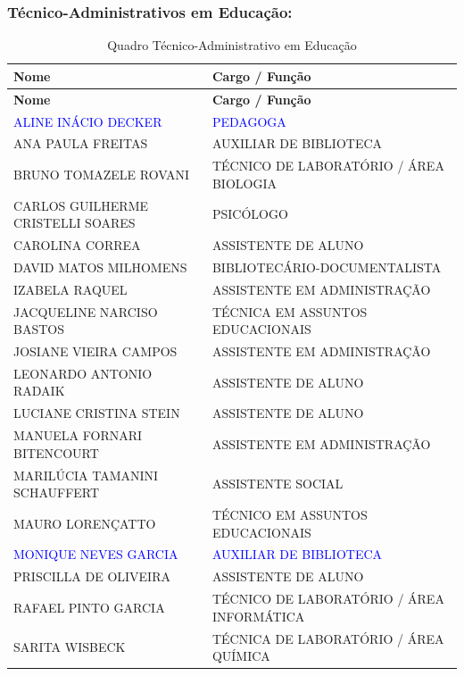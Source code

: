 \documentclass{../../modelos/latex-shared/ifsc-ppc}
\newcommand{\revisao}[1]{\textcolor{blue}{#1}}
\newcommand{\revisao}[1]{#1}
\begin{document}
\subsubsection{Técnico-Administrativos em Educação:}
\begin{xltabular}{\linewidth}{|X|X|}
\caption{Quadro Técnico-Administrativo em Educação} \label{tab:taes} \\
\hline
{}
\textbf{Nome} & \textbf{Cargo / Função} \\ \hline
\endfirsthead
\hline
{}
\textbf{Nome} & \textbf{Cargo / Função} \\ \hline
\endhead
\revisao{ALINE INÁCIO DECKER} & \revisao{PEDAGOGA} \\ \hline
ANA PAULA FREITAS & AUXILIAR DE BIBLIOTECA \\ \hline
BRUNO TOMAZELE ROVANI & TÉCNICO DE LABORATÓRIO / ÁREA BIOLOGIA \\ \hline
CARLOS GUILHERME CRISTELLI SOARES & PSICÓLOGO \\ \hline
CAROLINA CORREA & ASSISTENTE DE ALUNO \\ \hline
DAVID MATOS MILHOMENS & BIBLIOTECÁRIO-DOCUMENTALISTA \\ \hline
IZABELA RAQUEL & ASSISTENTE EM ADMINISTRAÇÃO \\ \hline
JACQUELINE NARCISO BASTOS & TÉCNICA EM ASSUNTOS EDUCACIONAIS \\ \hline
JOSIANE VIEIRA CAMPOS & ASSISTENTE EM ADMINISTRAÇÃO \\ \hline
LEONARDO ANTONIO RADAIK & ASSISTENTE DE ALUNO \\ \hline
LUCIANE CRISTINA STEIN & ASSISTENTE DE ALUNO \\ \hline
MANUELA FORNARI BITENCOURT & ASSISTENTE EM ADMINISTRAÇÃO \\ \hline
MARILÚCIA TAMANINI SCHAUFFERT & ASSISTENTE SOCIAL \\ \hline
MAURO LORENÇATTO & TÉCNICO EM ASSUNTOS EDUCACIONAIS \\ \hline
\revisao{MONIQUE NEVES GARCIA} & \revisao{AUXILIAR DE BIBLIOTECA} \\ \hline
PRISCILLA DE OLIVEIRA & ASSISTENTE DE ALUNO \\ \hline
RAFAEL PINTO GARCIA & TÉCNICO DE LABORATÓRIO / ÁREA INFORMÁTICA \\ \hline
SARITA WISBECK & TÉCNICA DE LABORATÓRIO / ÁREA QUÍMICA \\ \hline
\end{xltabular}

\end{document}
